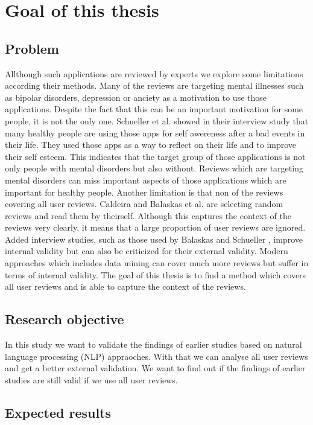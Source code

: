 
\chapter{Goal of this thesis}
\label{ch:goal}
\section{Problem}
\label{sec:problem}

Allthough such applications are reviewed by experts we explore some limitations according their methods.
Many of the reviews are targeting mental illnesses such as bipolar disorders, depression or anciety as a motivation to use those applications.
Despite the fact that this can be an important motivation for some people, it is not the only one.
Schueller et al. \cite{Schueller2021UnderstandingPU} showed in their interview study that many healthy people are using those apps for self awereness after a bad events in their life.
They used those apps as a way to reflect on their life and to improve their self esteem.
This indicates that the target group of those applications is not only people with mental disorders but also without.
Reviews which are targeting mental disorders can miss important aspects of those applications which are important for healthy people.
Another limitation is that non of the reviews covering all user reviews.
Caldeira \cite{caldeira_mobile_nodate} and Balaskas et al. \cite{Balaskas2022UnderstandingUP} are selecting random reviews and read them by theirself.
Although this captures the context of the reviews very clearly, it means that a large proportion of user reviews are ignored.
Added interview studies, such as those used by Balaskas \cite{Balaskas2022UnderstandingUP} and Schueller \cite{Balaskas2022UnderstandingUP},
improve internal validity but can also be criticized for their external validity.
Modern approaches which includes data mining can cover much more reviews but suffer in terms of internal validity.
The goal of this thesis is to find a method which covers all user reviews and is able to capture the context of the reviews.

\section{Research objective}
\label{sec:research-objective}

In this study we want to validate the findings of earlier studies based on natural language processing (NLP) appraoches.
With that we can analyse all user reviews and get a better external validation. 
We want to find out if the findings of earlier studies are still valid if we use all user reviews.



\section{Expected results}
\label{sec:expected-results}





